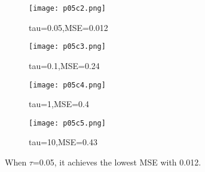 \documentclass{article}
\begin{document}
\begin{figure}[H]
    \centering
    \texttt{[image: p05c2.png]}
    \caption{tau=0.05,MSE=0.012}
\end{figure}

\begin{figure}[H]
    \centering
    \texttt{[image: p05c3.png]}
    \caption{tau=0.1,MSE=0.24}
\end{figure}

\begin{figure}[H]
    \centering
    \texttt{[image: p05c4.png]}
    \caption{tau=1,MSE=0.4}
\end{figure}

\begin{figure}[H]
    \centering
    \texttt{[image: p05c5.png]}
    \caption{tau=10,MSE=0.43}
\end{figure}

When $\tau$=0.05, it achieves the lowest MSE with 0.012.
\end{document}
